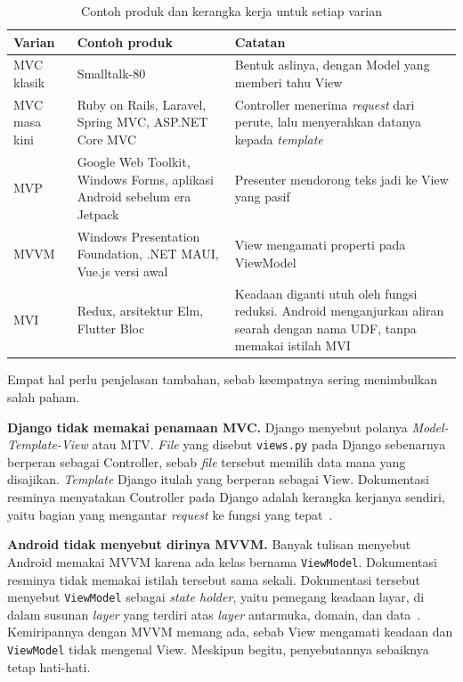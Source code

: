 \begin{table}[htbp]
  \centering
  \caption{Contoh produk dan kerangka kerja untuk setiap varian}
  \label{tab:produk-mv}
  \begin{tabularx}{\textwidth}{|l|X|X|}
    \hline
    \textbf{Varian} & \textbf{Contoh produk} & \textbf{Catatan} \\
    \hline
    MVC klasik & Smalltalk-80 & Bentuk aslinya, dengan Model yang memberi tahu View \\
    \hline
    MVC masa kini & Ruby on Rails, Laravel, Spring MVC, ASP.NET Core MVC & Controller menerima \textit{request} dari perute, lalu menyerahkan datanya kepada \textit{template} \\
    \hline
    MVP & Google Web Toolkit, Windows Forms, aplikasi Android sebelum era Jetpack & Presenter mendorong teks jadi ke View yang pasif \\
    \hline
    MVVM & Windows Presentation Foundation, .NET MAUI, Vue.js versi awal & View mengamati properti pada ViewModel \\
    \hline
    MVI & Redux, arsitektur Elm, Flutter Bloc & Keadaan diganti utuh oleh fungsi reduksi. Android menganjurkan aliran searah dengan nama UDF, tanpa memakai istilah MVI \\
    \hline
  \end{tabularx}
\end{table}

Empat hal perlu penjelasan tambahan, sebab keempatnya sering menimbulkan salah paham.

\textbf{Django tidak memakai penamaan MVC.} Django menyebut polanya
\textit{Model-Template-View} atau MTV. \textit{File} yang disebut \texttt{views.py} pada
Django sebenarnya berperan sebagai Controller, sebab \textit{file} tersebut memilih
data mana yang disajikan. \textit{Template} Django itulah yang berperan sebagai View.
Dokumentasi resminya menyatakan Controller pada Django adalah kerangka kerjanya
sendiri, yaitu bagian yang mengantar \textit{request} ke fungsi yang
tepat~\cite{django2026faq}.

\textbf{Android tidak menyebut dirinya MVVM.} Banyak tulisan menyebut Android
memakai MVVM karena ada kelas bernama \texttt{ViewModel}. Dokumentasi resminya
tidak memakai istilah tersebut sama sekali. Dokumentasi tersebut menyebut
\texttt{ViewModel} sebagai \textit{state holder}, yaitu pemegang keadaan layar,
di dalam susunan \textit{layer} yang terdiri atas
\textit{layer} antarmuka, domain, dan
data~\cite{android2026viewmodel}. Kemiripannya dengan MVVM memang ada, sebab
View mengamati keadaan dan \texttt{ViewModel} tidak mengenal View. Meskipun
begitu, penyebutannya sebaiknya tetap hati-hati.

